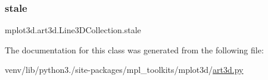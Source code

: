 \subsubsection{\texorpdfstring{stale}{stale}}
{\footnotesize\ttfamily mplot3d.\+art3d.\+Line3\+D\+Collection.\+stale}



The documentation for this class was generated from the following file\+:\begin{DoxyCompactItemize}
\item 
venv/lib/python3./site-\/packages/mpl\+\_\+toolkits/mplot3d/\hyperlink{art3d_8py}{art3d.\+py}\end{DoxyCompactItemize}
